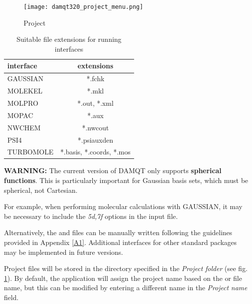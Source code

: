 \documentclass[10pt]{article}
\begin{document}
\begin{minipage}{.35\linewidth}
\vspace*{-2mm}
\begin{figure}[H]
\vspace*{-3mm}
\begin{center}
\texttt{[image: damqt320\_project\_menu.png]}
\end{center}
\caption{Project \label{fig:2_1_2}}
\end{figure}
\end{minipage}
\hspace*{1cm}
\vspace*{5mm}
\begin{minipage}{.45\linewidth}
\begin{table}[H]
\begin{center}
\caption{\label{tab:2.1}Suitable file extensions for running interfaces}
\begin{tabular}{l|c}
interface & extensions \\
\hline
GAUSSIAN & *.fchk \\
MOLEKEL & *.mkl \\
MOLPRO & *.out, *.xml \\
MOPAC & *.aux \\
NWCHEM & *.nwcout \\
PSI4 & *.psiauxden \\
TURBOMOLE & *.basis, *.coords, *.mos \\
\hline
\end{tabular}
\end{center}
\end{table}
\end{minipage}

{\bf WARNING:} The current version of DAMQT only supports {\bf spherical functions}.
This is particularly important for Gaussian basis sets, which must be spherical,
not Cartesian.

For example, when performing molecular calculations with GAUSSIAN,
it may be necessary to include the {\it 5d,7f} options in the input file.

Alternatively, the \ggbs{ } and \den{ } files can be manually written
following the guidelines provided in Appendix \ref{A1}.
Additional interfaces for other standard packages may be implemented in future versions.

Project files will be stored in the directory specified in the {\it Project folder}
(see fig. \ref{fig:2_1_2}). By default, the application will assign the project name
based on the \ggbs{ } or \sgbs{ } file name,
but this can be modified by entering a different name in the {\it Project name} field.
\end{document}
